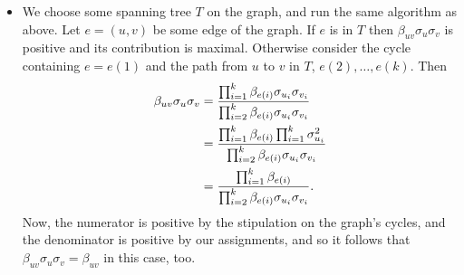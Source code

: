 \documentclass[11pt]{article} \usepackage{amssymb}
\begin{document}
\begin{itemize}
\item We choose some spanning tree $T$ on the graph, and run the same
  algorithm as above. Let $e=(u,v)$ be some edge of the graph. If $e$
  is in $T$ then $\beta_{uv}\sigma_u\sigma_v$ is positive and its
  contribution is maximal. Otherwise consider the cycle containing $e=e(1)$
  and the path from $u$ to $v$ in $T$, $e(2),\ldots,e(k)$. Then 
  \begin{align*}
    \beta_{uv}\sigma_u\sigma_v &=
    {\prod_{i=1}^k\beta_{e(i)}\sigma_{u_i}\sigma_{v_i}
      \over
      \prod_{i=2}^k\beta_{e(i)}\sigma_{u_i}\sigma_{v_i}
    }
    \\ &= 
    {\prod_{i=1}^k\beta_{e(i)}\prod_{i=1}^k\sigma_{u_i}^2
      \over
      \prod_{i=2}^k\beta_{e(i)}\sigma_{u_i}\sigma_{v_i}
    }
    \\ &= 
    {\prod_{i=1}^k\beta_{e(i)}
      \over
      \prod_{i=2}^k\beta_{e(i)}\sigma_{u_i}\sigma_{v_i}
    }.
  \end{align*}
  Now, the numerator is positive by the stipulation on the graph's
  cycles, and the denominator is positive by our assignments, and so
  it follows that  $\beta_{uv}\sigma_u\sigma_v=\beta_{uv}$ in this
  case, too.

\end{itemize}
\end{document}
